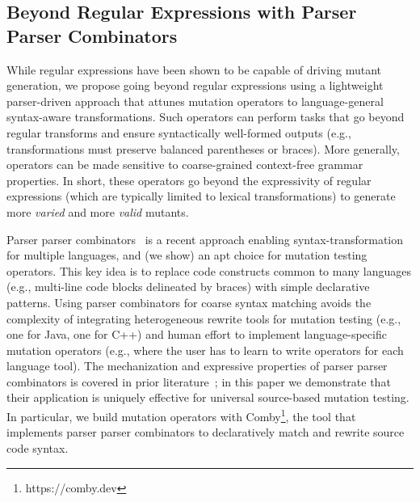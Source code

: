 \documentclass[sigconf,review, anonymous]{acmart}
\begin{document}
{\subsection{Beyond Regular Expressions with Parser Parser Combinators}




While regular expressions have been shown to be capable of driving mutant generation, we
propose going beyond regular expressions using a lightweight
parser-driven approach that attunes mutation operators to
language-general syntax-aware transformations. Such operators can
perform tasks that go beyond regular transforms and ensure
syntactically well-formed outputs (e.g., transformations must preserve
balanced parentheses or braces). More generally, operators can be made
sensitive to coarse-grained context-free grammar properties. In short,
these
operators go beyond the expressivity of regular expressions (which are
typically limited to lexical transformations) to generate more
\emph{varied} and more \emph{valid} mutants.

Parser parser combinators~\cite{vanTonderPPC} is a recent approach enabling
syntax-transformation for multiple languages, and (we show) an apt choice for
mutation testing operators. This key idea is to replace code constructs
common to many languages (e.g., multi-line code blocks delineated by braces)
with simple declarative patterns. Using parser combinators for coarse syntax
matching avoids the complexity of integrating heterogeneous rewrite tools for
mutation testing (e.g., one for Java, one for C++) and human effort to
implement language-specific mutation operators (e.g., where the user has to
learn to write operators for each language tool). The mechanization and
expressive properties of parser parser combinators is covered in prior
literature~\cite{vanTonderPPC}; in this paper we demonstrate that their application is
uniquely effective for universal source-based mutation testing. In
particular, we
build mutation operators with Comby\footnote{https://comby.dev}, the tool that implements parser parser
combinators to declaratively match and rewrite source code syntax. 

}
\end{document}
